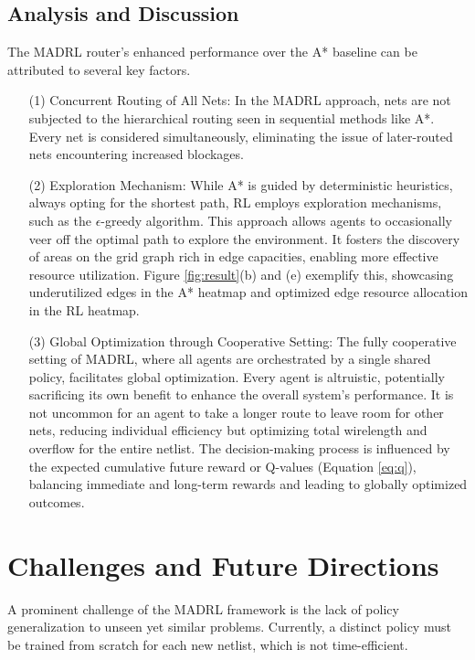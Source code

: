 \documentclass[conference]{IEEEtran}
\begin{document}
\subsection{Analysis and Discussion}
The MADRL router's enhanced performance over the A* baseline can be attributed to several key factors.
\begin{itemize}
    \item[(1)] Concurrent Routing of All Nets: In the MADRL approach, nets are not subjected to the hierarchical routing seen in sequential methods like A*. Every net is considered simultaneously, eliminating the issue of later-routed nets encountering increased blockages.
    \item[(2)] Exploration Mechanism: While A* is guided by deterministic heuristics, always opting for the shortest path, RL employs exploration mechanisms, such as the $\epsilon$-greedy algorithm. This approach allows agents to occasionally veer off the optimal path to explore the environment. It fosters the discovery of areas on the grid graph rich in edge capacities, enabling more effective resource utilization. Figure \ref{fig:result}(b) and (e) exemplify this, showcasing underutilized edges in the A* heatmap and optimized edge resource allocation in the RL heatmap.
    \item[(3)] Global Optimization through Cooperative Setting: The fully cooperative setting of MADRL, where all agents are orchestrated by a single shared policy, facilitates global optimization. Every agent is altruistic, potentially sacrificing its own benefit to enhance the overall system's performance. It is not uncommon for an agent to take a longer route to leave room for other nets, reducing individual efficiency but optimizing total wirelength and overflow for the entire netlist. The decision-making process is influenced by the expected cumulative future reward or Q-values (Equation \ref{eq:q}), balancing immediate and long-term rewards and leading to globally optimized outcomes.
\end{itemize}

\section{Challenges and Future Directions}

A prominent challenge of the MADRL framework is the lack of policy generalization to unseen yet similar problems. Currently, a distinct policy must be trained from scratch for each new netlist, which is not time-efficient.
\end{document}

